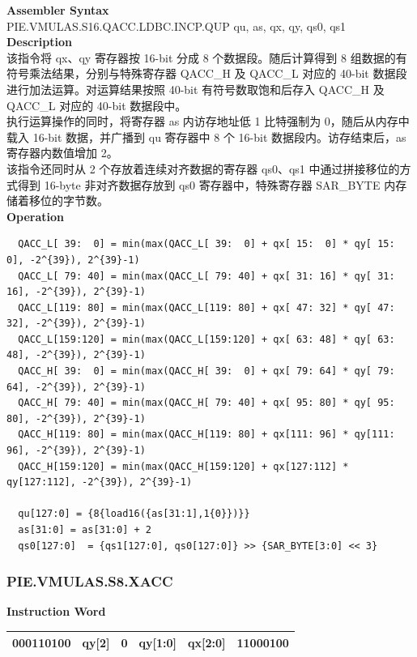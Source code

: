 \textbf{Assembler Syntax} \\
PIE.VMULAS.S16.QACC.LDBC.INCP.QUP qu, as, qx, qy, qs0, qs1 \\
\textbf{Description} \\
该指令将 qx、qy 寄存器按 16-bit 分成 8 个数据段。随后计算得到 8 组数据的有符号乘法结果，分别与特殊寄存器 QACC\_H 及 QACC\_L 对应的 40-bit 数据段进行加法运算。对运算结果按照 40-bit 有符号数取饱和后存入 QACC\_H 及 QACC\_L 对应的 40-bit 数据段中。\\
执行运算操作的同时，将寄存器 as 内访存地址低 1 比特强制为 0，随后从内存中载入 16-bit 数据，并广播到 qu 寄存器中 8 个 16-bit 数据段内。访存结束后，as 寄存器内数值增加 2。\\
该指令还同时从 2 个存放着连续对齐数据的寄存器 qs0、qs1 中通过拼接移位的方式得到 16-byte 非对齐数据存放到 qs0 寄存器中，特殊寄存器 SAR\_BYTE 内存储着移位的字节数。\\
\textbf{Operation}
\begin{lstlisting}
  QACC_L[ 39:  0] = min(max(QACC_L[ 39:  0] + qx[ 15:  0] * qy[ 15:  0], -2^{39}), 2^{39}-1)
  QACC_L[ 79: 40] = min(max(QACC_L[ 79: 40] + qx[ 31: 16] * qy[ 31: 16], -2^{39}), 2^{39}-1)
  QACC_L[119: 80] = min(max(QACC_L[119: 80] + qx[ 47: 32] * qy[ 47: 32], -2^{39}), 2^{39}-1)
  QACC_L[159:120] = min(max(QACC_L[159:120] + qx[ 63: 48] * qy[ 63: 48], -2^{39}), 2^{39}-1)
  QACC_H[ 39:  0] = min(max(QACC_H[ 39:  0] + qx[ 79: 64] * qy[ 79: 64], -2^{39}), 2^{39}-1)
  QACC_H[ 79: 40] = min(max(QACC_H[ 79: 40] + qx[ 95: 80] * qy[ 95: 80], -2^{39}), 2^{39}-1)
  QACC_H[119: 80] = min(max(QACC_H[119: 80] + qx[111: 96] * qy[111: 96], -2^{39}), 2^{39}-1)
  QACC_H[159:120] = min(max(QACC_H[159:120] + qx[127:112] * qy[127:112], -2^{39}), 2^{39}-1)

  qu[127:0] = {8{load16({as[31:1],1{0}})}}
  as[31:0] = as[31:0] + 2
  qs0[127:0]  = {qs1[127:0], qs0[127:0]} >> {SAR_BYTE[3:0] << 3}
\end{lstlisting}

\newpage
\subsubsection{PIE.VMULAS.S8.XACC}\label{instruction:PIEVMULASS8XACC}
\setlength\tabcolsep{6pt}
\textbf{Instruction Word} \\
\begin{tabular}{|c|c|c|c|c|c|}
	\hline
	000110100 & qy[2] & 0 & qy[1:0] & qx[2:0] & 11000100 \\
	\hline
\end{tabular}

